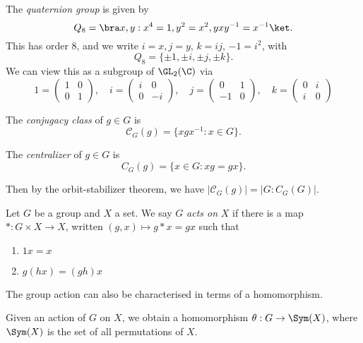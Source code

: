 \documentclass[a4paper]{article}
\begin{document}
\begin{defi}
  The \emph{quaternion group} is given by
  \[
    Q_8 = \bra x, y: x^4 = 1, y^2 = x^2, yxy^{-1} = x^{-1}\ket.
  \]
  This has order $8$, and we write $i = x, j = y$, $k = ij$, $-1 = i^2$, with
  \[
    Q_8 = \{\pm 1, \pm i, \pm j, \pm k\}.
  \]
  We can view this as a subgroup of $\GL_2(\C)$ via
  \[
    1 = \begin{pmatrix}
      1&0\\0&1
    \end{pmatrix},\quad
    i = \begin{pmatrix}
      i & 0\\0&-i
    \end{pmatrix},\quad
    j = \begin{pmatrix}
      0&1\\-1&0
    \end{pmatrix},\quad
    k = \begin{pmatrix}
      0&i\\i&0
    \end{pmatrix}
  \]
\end{defi}

\begin{defi}
  The \emph{conjugacy class} of $g \in G$ is
  \[
    \mathcal{C}_G(g)=\{xgx^{-1}: x \in G\}.
  \]
\end{defi}

\begin{defi}[Centralizer]
  The \emph{centralizer} of $g \in G$ is
  \[
    C_G(g) = \{x \in G: xg = gx\}.
  \]
\end{defi}
Then by the orbit-stabilizer theorem, we have $|\mathcal{C}_G(g)| = |G: C_G(G)|$.

\begin{defi}
  Let $G$ be a group and $X$ a set. We say $G$ \emph{acts on} $X$ if there is a map $*: G \times X \to X$, written $(g, x) \mapsto g * x = gx$ such that
  \begin{enumerate}
    \item $1x = x$
    \item $g(hx) = (gh)x$
  \end{enumerate}
\end{defi}

The group action can also be characterised in terms of a homomorphism.
\begin{lemma}
  Given an action of $G$ on $X$, we obtain a homomorphism $\theta: G \to \Sym(X)$, where $\Sym(X)$ is the set of all permutations of $X$.
\end{lemma}
\end{document}
